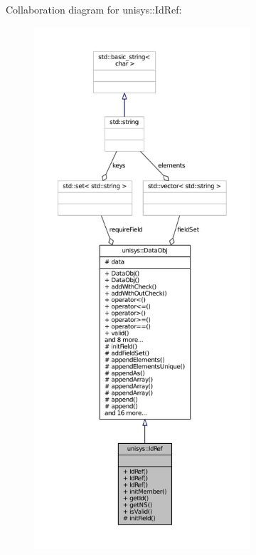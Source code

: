 Collaboration diagram for unisys\-:\-:Id\-Ref\-:
\nopagebreak
\begin{figure}[H]
\begin{center}
\leavevmode
\includegraphics[height=550pt]{classunisys_1_1IdRef__coll__graph}
\end{center}
\end{figure}
